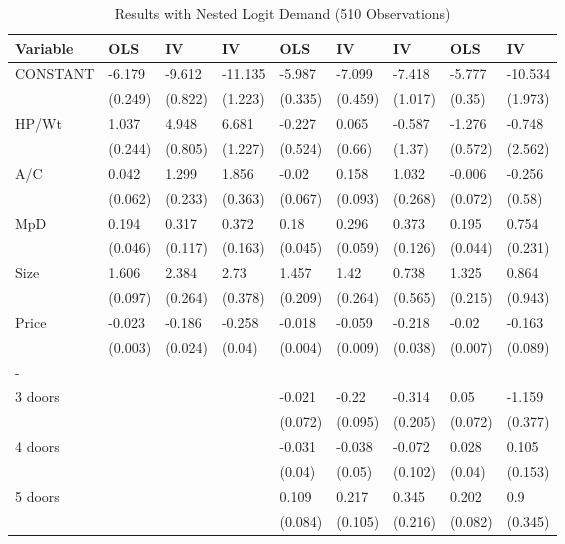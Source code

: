 \documentclass{article}\usepackage[]{graphicx}\usepackage[]{color}
\begin{document}
%
\begin{table}[ht]
\centering
\caption{Results with Nested Logit Demand 
 (510 Observations)} 
\label{tbl:nlogit_results}
\begingroup\footnotesize
\begin{tabular}{lllllllll}
  \toprule 
 Variable & OLS & IV & IV & OLS & IV & IV & OLS & IV \\
 \midrule 
 CONSTANT & -6.179 & -9.612 & -11.135 & -5.987 & -7.099 & -7.418 & -5.777 & -10.534 \\ 
   & (0.249) & (0.822) & (1.223) & (0.335) & (0.459) & (1.017) & (0.35) & (1.973) \\ 
  HP/Wt & 1.037 & 4.948 & 6.681 & -0.227 & 0.065 & -0.587 & -1.276 & -0.748 \\ 
   & (0.244) & (0.805) & (1.227) & (0.524) & (0.66) & (1.37) & (0.572) & (2.562) \\ 
  A/C & 0.042 & 1.299 & 1.856 & -0.02 & 0.158 & 1.032 & -0.006 & -0.256 \\ 
   & (0.062) & (0.233) & (0.363) & (0.067) & (0.093) & (0.268) & (0.072) & (0.58) \\ 
  MpD & 0.194 & 0.317 & 0.372 & 0.18 & 0.296 & 0.373 & 0.195 & 0.754 \\ 
   & (0.046) & (0.117) & (0.163) & (0.045) & (0.059) & (0.126) & (0.044) & (0.231) \\ 
  Size & 1.606 & 2.384 & 2.73 & 1.457 & 1.42 & 0.738 & 1.325 & 0.864 \\ 
   & (0.097) & (0.264) & (0.378) & (0.209) & (0.264) & (0.565) & (0.215) & (0.943) \\ 
  Price & -0.023 & -0.186 & -0.258 & -0.018 & -0.059 & -0.218 & -0.02 & -0.163 \\ 
   & (0.003) & (0.024) & (0.04) & (0.004) & (0.009) & (0.038) & (0.007) & (0.089) \\ 
  - &  &  &  &  &  &  &  &  \\ 
  3 doors &  &  &  & -0.021 & -0.22 & -0.314 & 0.05 & -1.159 \\ 
   &  &  &  & (0.072) & (0.095) & (0.205) & (0.072) & (0.377) \\ 
  4 doors &  &  &  & -0.031 & -0.038 & -0.072 & 0.028 & 0.105 \\ 
   &  &  &  & (0.04) & (0.05) & (0.102) & (0.04) & (0.153) \\ 
  5 doors &  &  &  & 0.109 & 0.217 & 0.345 & 0.202 & 0.9 \\ 
   &  &  &  & (0.084) & (0.105) & (0.216) & (0.082) & (0.345) \\ 

\end{tabular}
\end{table}
\end{document}
